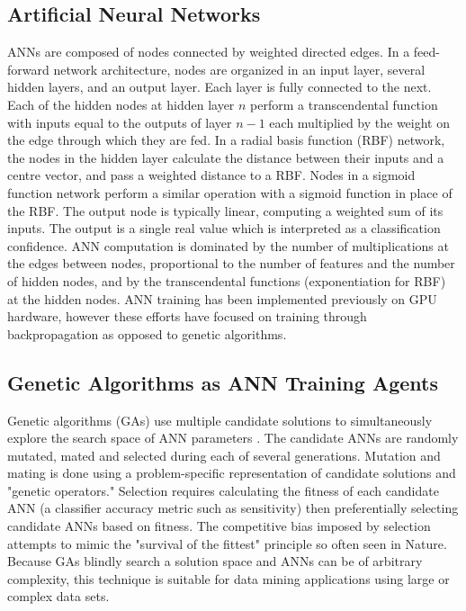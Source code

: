 \documentclass[11pt]{article}       %
\begin{document}
\subsection{Artificial Neural Networks} \label{ann}
ANNs are composed of nodes connected by weighted directed edges. In a feed-forward network architecture, nodes are organized in an input layer, several hidden layers, and an output layer. Each layer is fully connected to the next. Each of the hidden nodes at hidden layer $n$ perform a transcendental function with inputs equal to the outputs of layer $n-1$ each multiplied by the weight on the edge through which they are fed. In a radial basis function (RBF) network, the nodes in the hidden layer calculate the distance between their inputs and a centre vector, and pass a weighted distance to a RBF. Nodes in a sigmoid function network perform a similar operation with a sigmoid function in place of the RBF. The output node is typically linear, computing a weighted sum of its inputs. The output is a single real value which is interpreted as a classification confidence. ANN computation is dominated by the number of multiplications at the edges between nodes, proportional to the number of features and the number of hidden nodes, and by the transcendental functions (exponentiation for RBF) at the hidden nodes.  ANN training has been implemented previously on GPU hardware, however these efforts have focused on training through backpropagation \cite{backprop} as opposed to genetic algorithms.

\subsection{Genetic Algorithms as ANN Training Agents} \label{ga}
Genetic algorithms (GAs) use multiple candidate solutions to simultaneously explore the search space of ANN parameters \cite{GA-ANN}. The candidate ANNs are randomly mutated, mated and selected during each of several generations. Mutation and mating is done using a problem-specific representation of candidate solutions and "genetic operators." Selection requires calculating the fitness of each candidate ANN (a classifier accuracy metric such as sensitivity) then preferentially selecting candidate ANNs based on fitness. The competitive bias imposed by selection attempts to mimic the "survival of the fittest" principle so often seen in Nature.  Because GAs blindly search a solution space and ANNs can be of arbitrary complexity, this technique is suitable for data mining applications using large or complex data sets.
\end{document}
